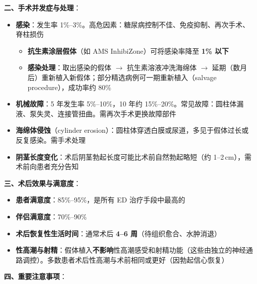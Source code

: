 \vspace{0.5em}
\noindent\textbf{二、手术并发症与处理}：

\begin{itemize}[leftmargin=2cm]
	\item \textbf{感染}：发生率 1\%--3\%。高危因素：糖尿病控制不佳、免疫抑制、再次手术、脊柱损伤
	\begin{itemize}
		\item \textbf{抗生素涂层假体}（如 AMS InhibiZone）可将感染率降至 \textbf{1\% 以下}
		\item \textbf{感染处理}：取出感染的假体 $\rightarrow$ 抗生素溶液冲洗海绵体 $\rightarrow$ 延期（数月后）重新植入新假体；部分精选病例可一期重新植入（salvage procedure），成功率约 80\%
	\end{itemize}
	\item \textbf{机械故障}：5 年发生率 5\%--10\%，10 年约 15\%--20\%。常见故障：圆柱体漏液、泵失灵、连接管扭曲。需再次手术更换故障部件
	\item \textbf{海绵体侵蚀}（cylinder erosion）：圆柱体穿透白膜或尿道，多见于假体过长或反复感染。需手术处理
	\item \textbf{阴茎长度变化}：术后阴茎勃起长度可能比术前自然勃起略短（约 1--2\,cm），需术前向患者充分告知
\end{itemize}

\vspace{0.5em}
\noindent\textbf{三、术后效果与满意度}：

\begin{itemize}[leftmargin=2cm]
	\item \textbf{患者满意度}：85\%--95\%，是所有 ED 治疗手段中最高的
	\item \textbf{伴侣满意度}：70\%--90\%
	\item \textbf{术后恢复性生活时间}：通常术后 \textbf{4--6 周}（待组织愈合、水肿消退）
	\item \textbf{性高潮与射精}：假体植入\textbf{不影响}性高潮感受和射精功能（这些由独立的神经通路调控）。多数患者术后性高潮与术前相同或更好（因勃起信心恢复）
\end{itemize}

\vspace{0.5em}
\noindent\textbf{四、重要注意事项}：

